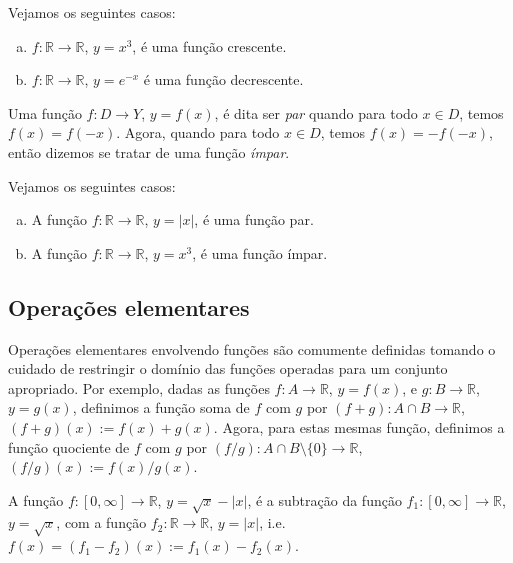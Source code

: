 \begin{ex}
  Vejamos os seguintes casos:
  \begin{enumerate}[a)]
  \item $f:\mathbb{R}\to\mathbb{R}$, $y = x^3$, é uma função crescente.
  \item $f:\mathbb{R}\to\mathbb{R}$, $y = e^{-x}$ é uma função decrescente.
  \end{enumerate}
\end{ex}

\begin{defn}
  Uma função $f:D\to Y$, $y = f(x)$, é dita ser \emph{par} quando para todo $x\in D$, temos $f(x) = f(-x)$. Agora, quando para todo $x\in D$, temos $f(x) = -f(-x)$, então dizemos se tratar de uma função \emph{ímpar}.
\end{defn}

\begin{ex}
  Vejamos os seguintes casos:
  \begin{enumerate}[a)]
  \item A função $f:\mathbb{R}\to\mathbb{R}$, $y=|x|$, é uma função par.
  \item A função $f:\mathbb{R}\to\mathbb{R}$, $y=x^3$, é uma função ímpar.
  \end{enumerate}
\end{ex}

\subsection{Operações elementares}

Operações elementares envolvendo funções são comumente definidas tomando o cuidado de restringir o domínio das funções operadas para um conjunto apropriado. Por exemplo, dadas as funções $f:A\to \mathbb{R}$, $y=f(x)$, e $g:B\to\mathbb{R}$, $y=g(x)$, definimos a função soma de $f$ com $g$ por $(f+g):A\cap B\to\mathbb{R}$, $(f+g)(x) := f(x) + g(x)$. Agora, para estas mesmas função, definimos a função quociente de $f$ com $g$ por $(f/g):A\cap B\setminus \{0\}\to\mathbb{R}$, $(f/g)(x) := f(x)/g(x)$.

\begin{ex}
  A função $f:[0, \infty]\to\mathbb{R}$, $y = \sqrt{x} - |x|$, é a subtração da função $f_1:[0, \infty]\to\mathbb{R}$, $y = \sqrt{x}$, com a função $f_2:\mathbb{R}\to\mathbb{R}$, $y = |x|$, i.e. $f(x) = (f_1-f_2)(x):= f_1(x) - f_2(x)$.
\end{ex}

